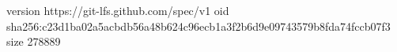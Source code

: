 version https://git-lfs.github.com/spec/v1
oid sha256:c23d1ba02a5acbdb56a48b624c96ecb1a3f2b6d9e09743579b8fda74fccb07f3
size 278889
